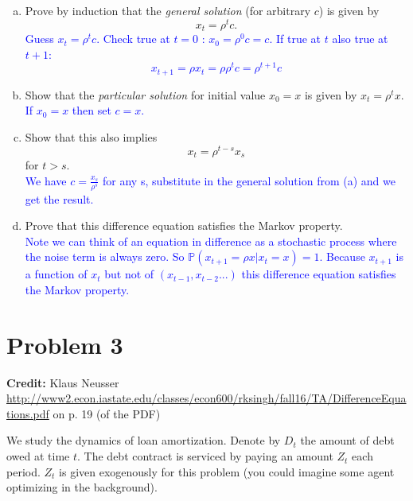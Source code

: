 \documentclass[11pt]{extarticle}
\theoremstyle{plain}
\theoremstyle{definition}
\begin{document}
\begin{enumerate}[(a)]
\item Prove by induction that the \textit{general solution} (for arbitrary $c$) is given by
\begin{equation*}
	x_t = \rho^t c.
\end{equation*}
\textcolor{blue}{Guess $x_t=\rho^t c$. Check true at $t= 0$ : $x_0 = \rho^0c=c$. If true at $t$ also true at $t+1$: $$x_{t+1}=\rho x_t = \rho \rho^t c= \rho^{t+1}c$$}

\item Show that the \textit{particular solution} for initial value $x_0 = x$ is given by $x_t = \rho^t x$. 
\textcolor{blue}{If $x_0=x$ then set $c=x$.}

\item Show that this also implies 
\begin{equation*}
	x_t = \rho^{t-s} x_s
\end{equation*}
for $t > s$. \\
\textcolor{blue}{We have $c=\frac{x_s}{\rho^s}$ for any s, substitute in the general solution from (a) and we get the result.}

\item Prove that this difference equation satisfies the Markov property. \\
\textcolor{blue}{Note we can think of an equation in difference as a stochastic process where the noise term is always zero. So $\mathbb P (x_{t+1}=\rho x|x_t=x)=1$. Because $x_{t+1}$ is a function of $x_t$ but not of $(x_{t-1},x_{t-2}...)$ this difference equation satisfies the Markov property.}
\end{enumerate}



\vspace{10mm}
\section*{Problem 3}

\textbf{Credit:} Klaus Neusser \url{http://www2.econ.iastate.edu/classes/econ600/rksingh/fall16/TA/DifferenceEquations.pdf} on p. 19 (of the PDF)

\vspace{5mm}
\noindent
We study the dynamics of loan amortization. Denote by $D_t$ the amount of debt owed at time $t$. The debt contract is serviced by paying an amount $Z_t$ each period. $Z_t$ is given exogenously for this problem (you could imagine some agent optimizing in the background).
\end{document}
